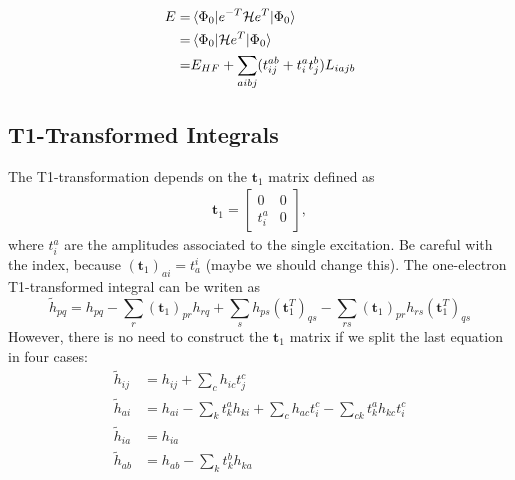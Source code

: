 \begin{equation}
  \begin{split}
    E =& \mel{\Phi_0}{e^{-T}\ensuremath{\mathcal{H}}e^T}{\Phi_0}\\
    =& \mel{\Phi_0}{\ensuremath{\mathcal{H}}e^T}{\Phi_0}\\
    =& E_{HF} + \sum_{aibj}(t_{ij}^{ab} + t_i^at_j^b) L_{iajb}
  \end{split}
\end{equation}

\subsection{T1-Transformed Integrals}
\hypertarget{sec:ccsd_t1_trans}{}
\label{sec:ccsd_t1_trans}

The T1-transformation depends on the $\mathbf{t}_1$ matrix defined as
\begin{gather}
  \mathbf{t}_1=
  \begin{bmatrix}
    0     & 0\\
    t_i^a & 0
  \end{bmatrix},
\end{gather}
where $t_i^a$ are the amplitudes associated to the single excitation.
Be careful with the index, because $(\mathbf{t}_1)_{ai}=t_a^i$ (maybe we should change this).
The one-electron T1-transformed integral can be writen as
\begin{equation}
  {\tilde h}_{pq}=h_{pq}-\sum_r(\mathbf{t}_1)_{pr}h_{rq}+\sum_sh_{ps}(\mathbf{t}_1^T)_{qs}-\sum_{rs}(\mathbf{t}_1)_{pr}h_{rs}(\mathbf{t}_1^T)_{qs}
\end{equation}
However, there is no need to construct the $\mathbf{t}_1$ matrix if we split the last equation in four cases:
\begin{align}
  {\tilde h}_{ij}&=h_{ij}+\sum_ch_{ic}t_{j}^{c}\\
  {\tilde h}_{ai}&=h_{ai}-\sum_kt_{k}^{a}h_{ki}+\sum_ch_{ac}t_{i}^{c}-\sum_{ck}t_{k}^{a}h_{kc}t_{i}^{c}\\
  {\tilde h}_{ia}&=h_{ia}\\
  {\tilde h}_{ab}&=h_{ab}-\sum_kt_{k}^{b}h_{ka}
\end{align}

